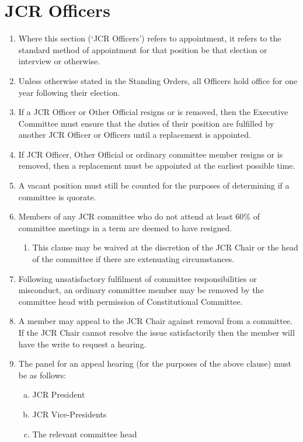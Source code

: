 \documentclass[12pt]{article}  %
\begin{document}
\section{JCR Officers}
\begin{enumerate}
    \item Where this section (‘JCR Officers’) refers to appointment, it refers to the standard method of appointment for that position be that election or interview or otherwise.
    \item Unless otherwise stated in the Standing Orders, all Officers hold office for one year following their election.
    \item If a JCR Officer or Other Official resigns or is removed, then the Executive Committee must ensure that the duties of their position are fulfilled by another JCR Officer or Officers until a replacement is appointed.
    \item If JCR Officer, Other Official or ordinary committee member resigns or is removed, then a replacement must be appointed at the earliest possible time.
    \item A vacant position must still be counted for the purposes of determining if a committee is quorate.
    \item Members of any JCR committee who do not attend at least 60\% of committee meetings in a term are deemed to have resigned.
    \begin{enumerate}
        \item This clause may be waived at the discretion of the JCR Chair or the head of the committee if there are extenuating circumstances.
    \end{enumerate}
    \item Following unsatisfactory fulfilment of committee responsibilities or misconduct, an ordinary committee member may be removed by the committee head with permission of Constitutional Committee.
    \item A member may appeal to the JCR Chair against removal from a committee. If the JCR Chair cannot resolve the issue satisfactorily then the member will have the write to request a hearing.
    \item The panel for an appeal hearing (for the purposes of the above clause) must be as follows:
    \begin{enumerate}[(a)]
        \item JCR President
        \item JCR Vice-Presidents
        \item The relevant committee head

\end{enumerate}
\end{enumerate}
\end{document}

